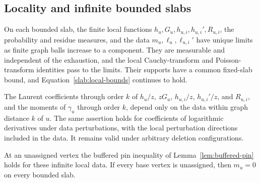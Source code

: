 \subsection{Locality and infinite bounded slabs}

\begin{lemma}
\label{lem:slab-limits}
On each bounded slab, the finite local functions
$h_u,G_u,h_{u,i},h_{u,i}',R_{u,i}$, the probability and residue
measures, and the data $m_u,\ell_u,\ell_{u,i}'$ have unique limits as
finite graph balls increase to a component. They are measurable and
independent of the exhaustion, and the local Cauchy-transform and
Poisson-transform identities pass to the limits.
Their supports have a common fixed-slab bound, and
Equation~\eqref{slab:local-bounds} continues to hold.

The Laurent coefficients through order $k$ of $h_u/z$, $zG_u$,
$h_{u,i}/z$, $h_{u,i}'/z$, and $R_{u,i}$, and the moments of
$\gamma_u$ through order $k$, depend only on the data within graph
distance $k$ of $u$. The same assertion holds for coefficients of
logarithmic derivatives under data perturbations, with the local
perturbation directions included in the data. It remains valid under
arbitrary deletion configurations.

At an unassigned vertex the buffered pin inequality
of Lemma~\ref{lem:buffered-pin} holds for these infinite local data.
If every base vertex is unassigned, then $m_u=0$ on every bounded slab.
\end{lemma}

